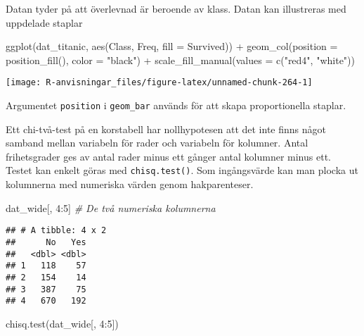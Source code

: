 \documentclass[
]{book}
\newenvironment{Shaded}{\begin{snugshade}}{\end{snugshade}}
\newcommand{\AttributeTok}[1]{\textcolor[rgb]{0.77,0.63,0.00}{#1}}
\newcommand{\CommentTok}[1]{\textcolor[rgb]{0.56,0.35,0.01}{\textit{#1}}}
\newcommand{\DecValTok}[1]{\textcolor[rgb]{0.00,0.00,0.81}{#1}}
\newcommand{\FunctionTok}[1]{\textcolor[rgb]{0.00,0.00,0.00}{#1}}
\newcommand{\NormalTok}[1]{#1}
\newcommand{\SpecialCharTok}[1]{\textcolor[rgb]{0.00,0.00,0.00}{#1}}
\newcommand{\StringTok}[1]{\textcolor[rgb]{0.31,0.60,0.02}{#1}}
\theoremstyle{definition}
\theoremstyle{definition}
\theoremstyle{definition}
\theoremstyle{definition}
\theoremstyle{remark}
\begin{document}
Datan tyder på att överlevnad är beroende av klass. Datan kan illustreras med uppdelade staplar

\begin{Shaded}
\begin{Highlighting}[]
\FunctionTok{ggplot}\NormalTok{(dat\_titanic, }\FunctionTok{aes}\NormalTok{(Class, Freq, }\AttributeTok{fill =}\NormalTok{ Survived)) }\SpecialCharTok{+}
  \FunctionTok{geom\_col}\NormalTok{(}\AttributeTok{position =} \FunctionTok{position\_fill}\NormalTok{(), }\AttributeTok{color =} \StringTok{"black"}\NormalTok{) }\SpecialCharTok{+}
  \FunctionTok{scale\_fill\_manual}\NormalTok{(}\AttributeTok{values =} \FunctionTok{c}\NormalTok{(}\StringTok{"red4"}\NormalTok{, }\StringTok{"white"}\NormalTok{))}
\end{Highlighting}
\end{Shaded}

\begin{center}\texttt{[image: R-anvisningar\_files/figure-latex/unnamed-chunk-264-1]} \end{center}

Argumentet \texttt{position} i \texttt{geom\_bar} används för att skapa proportionella staplar.

Ett chi-två-test på en korstabell har nollhypotesen att det inte finns något samband mellan variabeln för rader och variabeln för kolumner. Antal frihetsgrader ges av antal rader minus ett gånger antal kolumner minus ett. Testet kan enkelt göras med \texttt{chisq.test()}. Som ingångsvärde kan man plocka ut kolumnerna med numeriska värden genom hakparenteser.

\begin{Shaded}
\begin{Highlighting}[]
\NormalTok{dat\_wide[, }\DecValTok{4}\SpecialCharTok{:}\DecValTok{5}\NormalTok{] }\CommentTok{\# De två numeriska kolumnerna}
\end{Highlighting}
\end{Shaded}

\begin{verbatim}
## # A tibble: 4 x 2
##      No   Yes
##   <dbl> <dbl>
## 1   118    57
## 2   154    14
## 3   387    75
## 4   670   192
\end{verbatim}

\begin{Shaded}
\begin{Highlighting}[]
\FunctionTok{chisq.test}\NormalTok{(dat\_wide[, }\DecValTok{4}\SpecialCharTok{:}\DecValTok{5}\NormalTok{])}
\end{Highlighting}
\end{Shaded}
\end{document}
